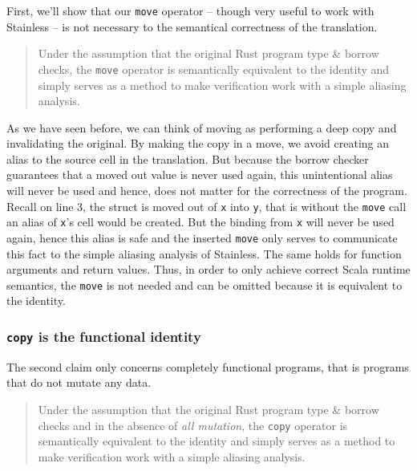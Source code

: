 First, we'll show that our \passthrough{\lstinline!move!} operator --
though very useful to work with Stainless -- is not necessary to the
semantical correctness of the translation.

\begin{quote}
Under the assumption that the original Rust program type \& borrow
checks, the \passthrough{\lstinline!move!} operator is semantically
equivalent to the identity and simply serves as a method to make
verification work with a simple aliasing analysis.
\end{quote}

As we have seen before, we can think of moving as performing a deep copy and
invalidating the original. By making the copy in a move, we avoid creating an
alias to the source cell in the translation. But because the borrow checker
guarantees that a moved out value is never used again, this unintentional alias
will never be used and hence, does not matter for the correctness of the
program. Recall  on line 3, the struct is moved out of
\passthrough{\lstinline!x!} into \passthrough{\lstinline!y!}, that is without
the \passthrough{\lstinline!move!} call an alias of
\passthrough{\lstinline!x!}'s cell would be created. But the binding from
\passthrough{\lstinline!x!} will never be used again, hence this alias is safe
and the inserted \passthrough{\lstinline!move!} only serves to communicate this
fact to the simple aliasing analysis of Stainless. The same holds for function
arguments and return values. Thus, in order to only achieve correct Scala
runtime semantics, the \passthrough{\lstinline!move!} is not needed and can be
omitted because it is equivalent to the identity.

\subsubsection{\texorpdfstring{\texttt{copy} is the functional
identity}{copy is the functional identity}}

The second claim only concerns completely functional programs, that is
programs that do not mutate any data.

\begin{quote}
Under the assumption that the original Rust program type \& borrow
checks and in the absence of \emph{all mutation}, the
\passthrough{\lstinline!copy!} operator is semantically equivalent to
the identity and simply serves as a method to make verification work
with a simple aliasing analysis.
\end{quote}

